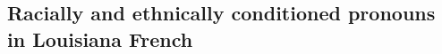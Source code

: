     \subsection{Racially and ethnically conditioned pronouns in Louisiana French} %




      







